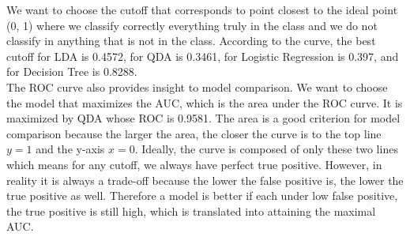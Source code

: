 \documentclass[jou]{apa}%
\begin{document}
\indent We want to choose the cutoff that corresponds to point closest to the ideal point (0, 1) where we classify correctly everything truly in the class and we do not classify in anything that is not in the class. According to the curve, the best cutoff for LDA is 0.4572, for QDA is 0.3461, for Logistic Regression is 0.397, and for Decision Tree is 0.8288.\\
\indent The ROC curve also provides insight to model comparison. We want to choose the model that maximizes the AUC, which is the area under the ROC curve. It is maximized by QDA whose ROC is 0.9581. The area is a good criterion for model comparison because the larger the area, the closer the curve is to the top line $y = 1$ and the y-axis $x = 0$. Ideally, the curve is composed of only these two lines which means for any cutoff, we always have perfect true positive. However, in reality it is always a trade-off because the lower the false positive is, the lower the true positive as well. Therefore a model is better if each under low false positive, the true positive is still high, which is translated into attaining the maximal AUC. 
\end{document}
